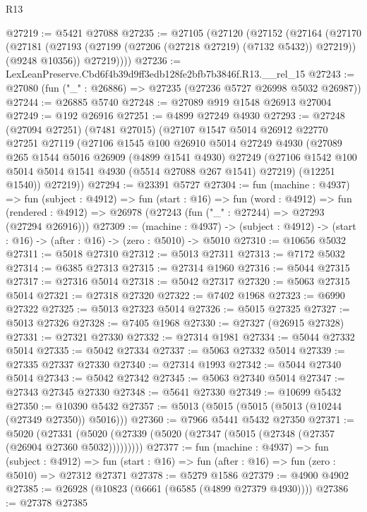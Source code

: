 \begin{lexlean}{R13}
\begin{coremodule}
@27219 := @5421 @27088
@27235 := @27105
    (@27120
      (@27152
        (@27164
          (@27170
            (@27181 (@27193 (@27199 (@27206 (@27218 @27219) (@7132 @5432)) @27219)) (@9248 @10356))
            @27219))))
@27236 := LexLeanPreserve.Cbd6f4b39d9ff3edb128fe2bfb7b3846f.R13.__rel_15
@27243 := @27080 (fun ("_" : @26886) => @27235 (@27236 @5727 @26998 @5032 @26987))
@27244 := @26885 @5740
@27248 := @27089 @919 @1548 @26913 @27004
@27249 := @192 @26916
@27251 := @4899 @27249 @4930
@27293 := @27248
    (@27094 @27251)
    (@7481 @27015)
    (@27107
      @1547
      @5014
      @26912
      @22770
      @27251
      @27119
      (@27106
        @1545
        @100
        @26910
        @5014
        @27249
        @4930
        (@27089
          @265
          @1544
          @5016
          @26909
          (@4899 @1541 @4930)
          @27249
          (@27106 @1542 @100 @5014 @5014 @1541 @4930 (@5514 @27088 @267 @1541) @27219)
          (@12251 @1540))
        @27219))
@27294 := @23391 @5727
@27304 := fun (machine : @4937) =>
  fun (subject : @4912) =>
  fun (start : @16) =>
  fun (word : @4912) =>
  fun (rendered : @4912) => @26978 (@27243 (fun ("_" : @27244) => @27293 (@27294 @26916)))
@27309 := (machine : @4937) ->
  (subject : @4912) -> (start : @16) -> (after : @16) -> (zero : @5010) -> @5010
@27310 := @10656 @5032
@27311 := @5018 @27310
@27312 := @5013 @27311
@27313 := @7172 @5032
@27314 := @6385 @27313
@27315 := @27314 @1960
@27316 := @5044 @27315
@27317 := @27316 @5014
@27318 := @5042 @27317
@27320 := @5063 @27315 @5014
@27321 := @27318 @27320
@27322 := @7402 @1968
@27323 := @6990 @27322
@27325 := @5013 @27323 @5014
@27326 := @5015 @27325
@27327 := @5013 @27326
@27328 := @7405 @1968
@27330 := @27327 (@26915 @27328)
@27331 := @27321 @27330
@27332 := @27314 @1981
@27334 := @5044 @27332 @5014
@27335 := @5042 @27334
@27337 := @5063 @27332 @5014
@27339 := @27335 @27337 @27330
@27340 := @27314 @1993
@27342 := @5044 @27340 @5014
@27343 := @5042 @27342
@27345 := @5063 @27340 @5014
@27347 := @27343 @27345 @27330
@27348 := @5641 @27330
@27349 := @10699 @5432
@27350 := @10390 @5432
@27357 := @5013 (@5015 (@5015 (@5013 (@10244 (@27349 @27350)) @5016)))
@27360 := @7966 @5441 @5432 @27350
@27371 := @5020
    (@27331 (@5020 (@27339 (@5020 (@27347 (@5015 (@27348 (@27357 (@26904 @27360 @5032)))))))))
@27377 := fun (machine : @4937) =>
  fun (subject : @4912) =>
  fun (start : @16) => fun (after : @16) => fun (zero : @5010) => @27312 @27371
@27378 := @5279 @1586
@27379 := @4900 @4902
@27385 := @26928 (@10823 (@6661 (@6585 (@4899 @27379 @4930))))
@27386 := @27378 @27385

\end{coremodule}
\end{lexlean}
